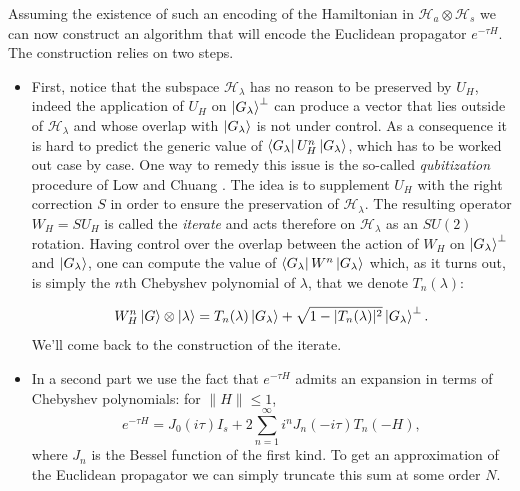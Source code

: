 \documentclass[a4paper,11pt]{article}
\begin{document}
Assuming the existence of such an encoding of the Hamiltonian in $\mathcal{H}_a\otimes\mathcal{H}_s$ we can now construct an algorithm that will encode the Euclidean propagator $e^{-\tau H}$. The construction relies on two steps.
\begin{itemize}
    \item First, notice that the subspace $\mathcal{H}_\lambda$ has no reason to be preserved by $U_H$, indeed the application of $U_H$ on $\ket{G_\lambda}^\perp$ can produce a vector that lies outside of $\mathcal{H}_\lambda$ and whose overlap with $\ket{G_\lambda}$ is not under control. As a consequence it is hard to predict the generic value of $\bra{G_\lambda}U^n_H\ket{G_\lambda}$, which has to be worked out case by case. One way to remedy this issue is the so-called \emph{qubitization} procedure of Low and Chuang \cite{Low2019hamiltonian}. The idea is to supplement $U_H$ with the right correction $S$ in order to ensure the preservation of $\mathcal{H_\lambda}$. The resulting operator $W_H = SU_H$ is called the \emph{iterate} and acts therefore on $\mathcal{H}_\lambda$ as an $SU(2)$ rotation. Having control over the overlap between the action of $W_H$ on $\ket{G_\lambda}^\perp$ and $\ket{G_\lambda}$, one can compute the value of $\bra{G_\lambda}W^n\ket{G_\lambda}$ which, as it turns out, is simply the $n$th Chebyshev polynomial of $\lambda$, that we denote $T_n(\lambda)$:

    \begin{equation}
    W_H^n\ket{G}\otimes \ket{\lambda}=T_n(\lambda)\ket{G_\lambda}+\sqrt{1-|T_n(\lambda)|^2}\ket{G_\lambda}^\perp.
    \label{IterateEigenEncoding}
    \end{equation}
    We'll come back to the construction of the iterate.


    \item In a second part we use the fact that $e^{-\tau H}$ admits an expansion in terms of Chebyshev polynomials: for $\|H\|\leq 1$,
    \begin{equation}
        e^{-\tau H}=J_0(i\tau)I_s+2\sum_{n=1}^\infty i^n J_n(-i\tau)T_n(-H),
        \label{ChebExp}
    \end{equation}
    where $J_n$ is the Bessel function of the first kind. To get an approximation of the Euclidean propagator we can simply truncate this sum at some order $N$. 
    

\end{itemize}
\end{document}
